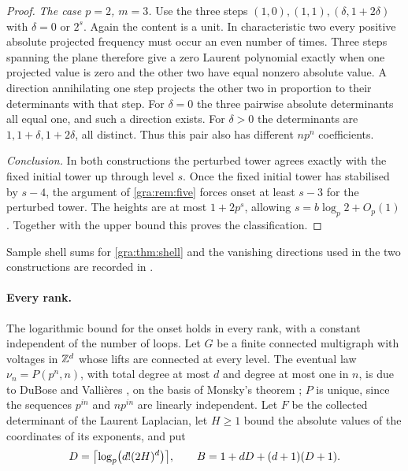 \begin{proof}
\emph{The case $p=2$, $m=3$.} Use the three steps
$(1,0),(1,1),(\delta,1+2\delta)$ with $\delta=0$ or $2^s$. Again the
content is a unit. In characteristic two every positive absolute projected
frequency must occur an even number of times. Three steps spanning the
plane therefore give a zero Laurent polynomial exactly when one projected
value is zero and the other two have equal nonzero absolute value. A
direction annihilating one step projects the other two in proportion to
their determinants with that step. For $\delta=0$ the three pairwise
absolute determinants all equal one, and such a direction exists. For
$\delta>0$ the determinants are $1,1+\delta,1+2\delta$, all distinct. Thus
this pair also has different $np^n$ coefficients.

\emph{Conclusion.} In both constructions the perturbed tower agrees
exactly with the fixed initial tower up through level $s$. Once the fixed
initial tower has stabilised by $s-4$, the argument of
\cref{gra:rem:five} forces onset at least $s-3$ for the perturbed tower.
The heights are at most $1+2p^s$, allowing $s=b\log_p2+O_p(1)$. Together
with the upper bound this proves the classification.
\end{proof}

Sample shell sums for \cref{gra:thm:shell} and the vanishing directions
used in the two constructions are recorded in
.

\paragraph{Every rank.}
The logarithmic bound for the onset holds in every rank, with a constant
independent of the number of loops. Let $G$ be a finite connected
multigraph with voltages in $\Z^d$ whose lifts are connected at every
level. The eventual law $\nu_n=P(p^n,n)$, with total degree at most $d$ and
degree at most one in $n$, is due to DuBose and Valli\`eres
\cite[Theorem~6.2]{DuBoseVallieres2023Towers}, on the basis of Monsky's
theorem \cite[Theorem~5.6]{Monsky1981Padic}; $P$ is unique, since the
sequences $p^{in}$ and $np^{in}$ are linearly independent. Let $F$ be the
collected determinant of the Laurent Laplacian, let $H\ge1$ bound the
absolute values of the coordinates of its exponents, and put
\begin{equation}\label{gra:eq:onsetB}
 D=\ceil[\big]{\log_p\bigl(d!(2H)^d\bigr)},\qquad B=1+dD+(d+1)(D+1).
\end{equation}

